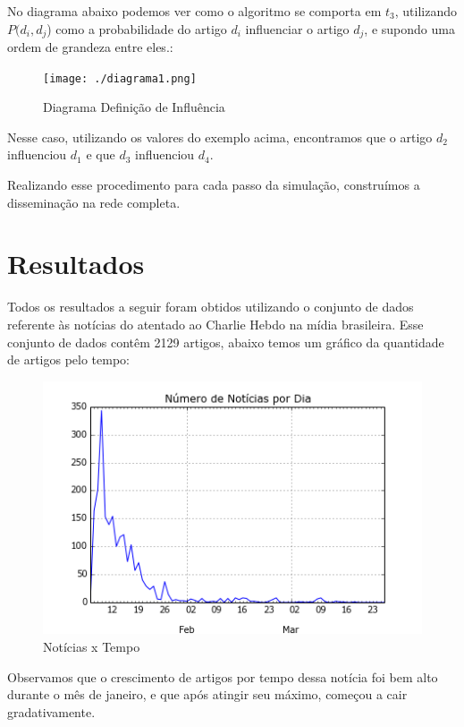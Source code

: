 \documentclass[a4paper,12pt]{article}
\begin{document}
    No diagrama abaixo podemos ver como o algoritmo se comporta em $t_{3}$, utilizando $P(d_{i},d_{j}$) como a probabilidade do artigo
    $d_{i}$ influenciar o artigo $d_{j}$, e supondo uma ordem de grandeza entre eles.:
    
    \begin{figure}[h]
      \centering
      \texttt{[image: ./diagrama1.png]}
      \caption{Diagrama Definição de Influência}
    \end{figure}
  
   Nesse caso, utilizando os valores do exemplo acima, encontramos que o artigo $d_{2}$ influenciou $d_{1}$ e que $d_{3}$ influenciou
   $d_{4}$.
   
   Realizando esse procedimento para cada passo da simulação, construímos a disseminação na rede completa.

\pagebreak  
\section{Resultados}
 
Todos os resultados a seguir foram obtidos utilizando o conjunto de dados referente às notícias do atentado ao Charlie Hebdo na mídia
brasileira. 
Esse conjunto de dados contêm 2129 artigos, abaixo temos um gráfico da quantidade de artigos pelo tempo:

\begin{figure}[h]
 \centering
 \includegraphics[scale=0.7]{./grafic.png}
 \caption{Notícias x Tempo}
\end{figure}

Observamos que o crescimento de artigos por tempo dessa notícia foi bem alto durante o mês de janeiro, e que após atingir seu máximo, começou
a cair gradativamente.
\end{document}
